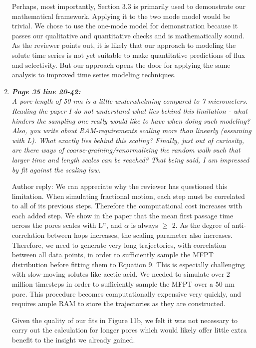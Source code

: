 \documentclass{article}
\begin{document}
\begin{enumerate}[label={Comment \theenumi :}, leftmargin=3.9\parindent]
        Perhaps, most importantly, Section 3.3 is primarily used to demonstrate our mathematical
        framework. Applying it to the two mode model would be trivial. We chose to use the one-mode 
        model for demonstration because it passes our qualitative and quantitative checks and is
        mathematically sound. As the reviewer points out, it is likely that our approach to 
        modeling the solute time series is not yet suitable to make quantitative predictions of 
        flux and selectivity. But our approach opens the door for applying the same analysis to 
        improved time series modeling techniques.
         
  \item \textit{\textbf{Page 35 line 20-42:}\\
        A pore-length of 50 nm is a little underwhelming compared to 7 micrometers. Reading the paper
		I do not understand what lies behind this limitation - what hinders the sampling one really would
		like to have when doing such modeling? Also, you write about RAM-requirements scaling more
		than linearly (assuming with L). What exactly lies behind this scaling? Finally, just out of
		curiosity, are there ways of coarse-graining/renormalizing the random walk such that larger time
		and length scales can be reached? That being said, I am impressed by fit against the scaling
	  	law.}
	  	  
	  	Author reply: We can appreciate why the reviewer has questioned this limitation.
		When simulating fractional motion, each step must be correlated to all of its previous 
		steps. Therefore the computational cost increases with each added step. We show in the paper
		that the mean first passage time across the pores scales with L$^{\alpha}$, and $\alpha$ is
		always $\geq$ 2. As the degree of anti-correlation between hops increases, the scaling
		parameter also increases. Therefore, we need to generate very long trajectories, with 
		correlation between all data points, in order to sufficiently sample the MFPT distribution 
		before fitting them to Equation 9. This is especially challenging with slow-moving solutes
		like acetic acid. We needed to simulate over 2 million timesteps in order to sufficiently
		sample the MFPT over a 50 nm pore. This procedure becomes computationally expensive very
		quickly, and requires ample RAM to store the trajectories as they are constructed.
		
		Given the quality of our fits in Figure 11b, we felt it was not necessary to carry out the
		calculation for longer pores which would likely offer little extra benefit to the insight we
		already gained.
		 	

\end{enumerate}
\end{document}
